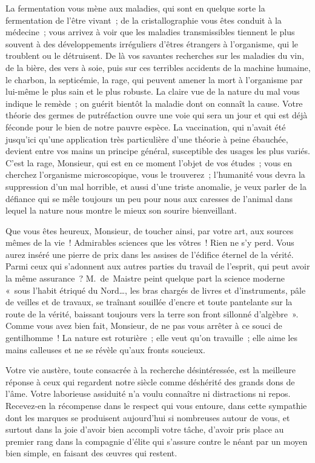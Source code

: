 \documentclass[french,twoside]{book} %
\newcommand\persName[1]{#1}
\newcommand\placeName[1]{#1}
\begin{document}
La fermentation vous mène aux maladies, qui sont en quelque sorte la fermentation de l’être vivant ; de la cristallographie vous êtes conduit à la médecine ; vous arrivez à voir que les maladies transmissibles tiennent le plus souvent à des développements irréguliers d’êtres étrangers à l’organisme, qui le troublent ou le détruisent. De là vos savantes recherches sur les maladies du vin, de la bière, des vers à soie, puis sur ces terribles accidents de la machine humaine, le charbon, la septicémie, la rage, qui peuvent amener la mort à l’organisme par lui-même le plus sain et le plus robuste. La claire vue de la nature du mal vous indique le remède ; on guérit bientôt la maladie dont on connaît la cause. Votre théorie des germes de putréfaction ouvre une voie qui sera un jour et qui est déjà féconde pour le bien de notre pauvre espèce. La vaccination, qui n’avait été jusqu’ici qu’une application très particulière d’une théorie à peine ébauchée, devient entre vos mains un principe général, susceptible des usages les plus variés. C’est la rage, Monsieur, qui est en ce moment l’objet de vos études ; vous en cherchez l’organisme microscopique, vous le trouverez ; l’humanité vous devra la suppression d’un mal horrible, et aussi d’une triste anomalie, je veux parler de la défiance qui se mêle toujours un peu pour nous aux caresses de l’animal dans lequel la nature nous montre le mieux son sourire bienveillant.\par
Que vous êtes heureux, Monsieur, de toucher ainsi, par votre art, aux sources mêmes de la vie ! Admirables sciences que les vôtres ! Rien ne s’y perd. Vous aurez inséré une pierre de prix dans les assises de l’édifice éternel de la vérité. Parmi ceux qui s’adonnent aux autres parties du travail de l’esprit, qui peut avoir la même assurance ? {\persName M. de Maistre} peint quelque part la science moderne « sous l’habit étriqué du {\placeName Nord}…, les bras chargés de livres et d’instruments, pâle de veilles et de travaux, se traînant souillée d’encre et toute pantelante sur la route de la vérité, baissant toujours vers la terre son front sillonné d’algèbre ». Comme vous avez bien fait, Monsieur, de ne pas vous arrêter à ce souci de gentilhomme ! La nature est roturière ; elle veut qu’on travaille ; elle aime les mains calleuses et ne se révèle qu’aux fronts soucieux.\par
Votre vie austère, toute consacrée à la recherche désintéressée, est la meilleure réponse à ceux qui regardent notre siècle comme déshérité des grands dons de l’âme. Votre laborieuse assiduité n’a voulu connaître ni distractions ni repos. Recevez-en la récompense dans le respect qui vous entoure, dans cette sympathie dont les marques se produisent aujourd’hui si nombreuses autour de vous, et surtout dans la joie d’avoir bien accompli votre tâche, d’avoir pris place au premier rang dans la compagnie d’élite qui s’assure contre le néant par un moyen bien simple, en faisant des œuvres qui restent.\par
\end{document}
